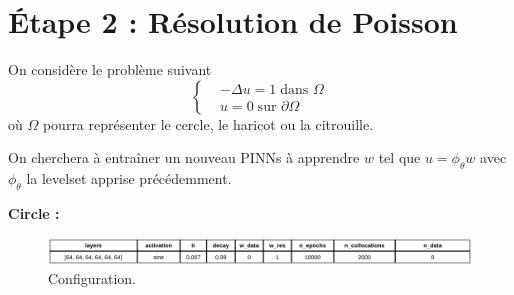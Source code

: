 \documentclass[french]{article}
\begin{document}
	\section{Étape 2 : Résolution de Poisson}
	
	On considère le problème suivant
	\begin{equation*}
		\left\{\begin{aligned}
			&-\Delta u=1 \; \text{dans } \Omega \\
			&u=0 \; \text{sur } \partial\Omega
		\end{aligned}\right.
	\end{equation*}
	où $\Omega$ pourra représenter le cercle, le haricot ou la citrouille.
	
	On cherchera à entraîner un nouveau PINNs à apprendre $w$ tel que $u=\phi_\theta w$ avec $\phi_ \theta$ la levelset apprise précédemment.
	
	\textbf{Circle :}
	
	\begin{figure}[H]
		\centering
		\includegraphics[width=\linewidth]{"poisson/circle/config.png"}
		\caption{Configuration.}
	\end{figure}
	
\end{document}
